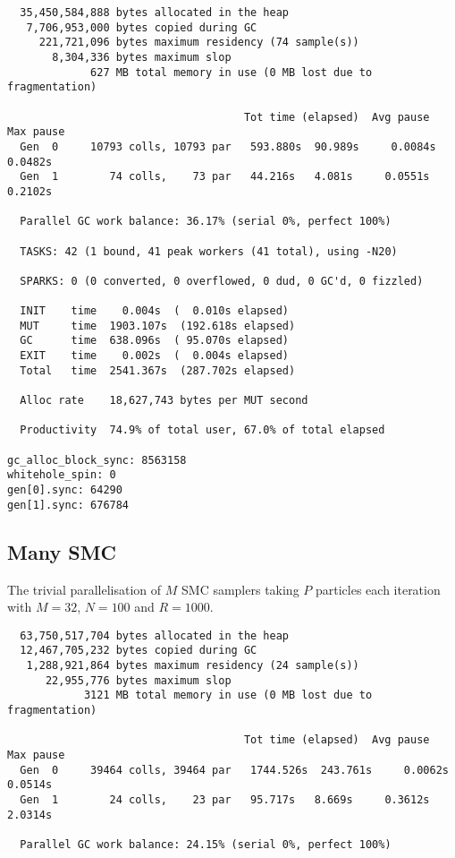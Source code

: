 {\small \begin{verbatim}
  35,450,584,888 bytes allocated in the heap
   7,706,953,000 bytes copied during GC
     221,721,096 bytes maximum residency (74 sample(s))
       8,304,336 bytes maximum slop
             627 MB total memory in use (0 MB lost due to fragmentation)

                                     Tot time (elapsed)  Avg pause  Max pause
  Gen  0     10793 colls, 10793 par   593.880s  90.989s     0.0084s    0.0482s
  Gen  1        74 colls,    73 par   44.216s   4.081s     0.0551s    0.2102s

  Parallel GC work balance: 36.17% (serial 0%, perfect 100%)

  TASKS: 42 (1 bound, 41 peak workers (41 total), using -N20)

  SPARKS: 0 (0 converted, 0 overflowed, 0 dud, 0 GC'd, 0 fizzled)

  INIT    time    0.004s  (  0.010s elapsed)
  MUT     time  1903.107s  (192.618s elapsed)
  GC      time  638.096s  ( 95.070s elapsed)
  EXIT    time    0.002s  (  0.004s elapsed)
  Total   time  2541.367s  (287.702s elapsed)

  Alloc rate    18,627,743 bytes per MUT second

  Productivity  74.9% of total user, 67.0% of total elapsed

gc_alloc_block_sync: 8563158
whitehole_spin: 0
gen[0].sync: 64290
gen[1].sync: 676784
\end{verbatim}
\subsection{Many SMC}
\label{sub:many_smc}

The trivial parallelisation of $M$ SMC samplers taking $P$ particles each iteration with $M=32$, $N=100$ and $R = 1000$.

{\small \begin{verbatim}
  63,750,517,704 bytes allocated in the heap
  12,467,705,232 bytes copied during GC
   1,288,921,864 bytes maximum residency (24 sample(s))
      22,955,776 bytes maximum slop
            3121 MB total memory in use (0 MB lost due to fragmentation)

                                     Tot time (elapsed)  Avg pause  Max pause
  Gen  0     39464 colls, 39464 par   1744.526s  243.761s     0.0062s    0.0514s
  Gen  1        24 colls,    23 par   95.717s   8.669s     0.3612s    2.0314s

  Parallel GC work balance: 24.15% (serial 0%, perfect 100%)


\end{verbatim}}}
